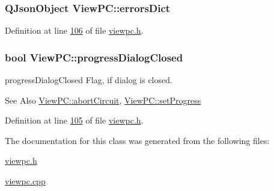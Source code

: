 \hypertarget{class_view_p_c_a26f90436aca32e5bad46f5e69a7e7e09}{
\subsubsection[{errors\-Dict}]{\setlength{\rightskip}{0pt plus 5cm}Q\-Json\-Object View\-P\-C\-::errors\-Dict}}\label{class_view_p_c_a26f90436aca32e5bad46f5e69a7e7e09}


Definition at line \hyperlink{viewpc_8h_source_l00106}{106} of file \hyperlink{viewpc_8h_source}{viewpc.\-h}.

\hypertarget{class_view_p_c_add8c82aa2b0b934212aa5bde9277ab36}{
\subsubsection[{progress\-Dialog\-Closed}]{\setlength{\rightskip}{0pt plus 5cm}bool View\-P\-C\-::progress\-Dialog\-Closed}}\label{class_view_p_c_add8c82aa2b0b934212aa5bde9277ab36}


progress\-Dialog\-Closed Flag, if dialog is closed. 

\begin{DoxySeeAlso}{See Also}
\hyperlink{class_view_p_c_ad7ba2fcf1d17862de15e32432823f7b0}{View\-P\-C\-::abort\-Circuit}, \hyperlink{class_view_p_c_a9c32a1fdb6ead84e5ada8fba8860c7ed}{View\-P\-C\-::set\-Progress} 
\end{DoxySeeAlso}


Definition at line \hyperlink{viewpc_8h_source_l00105}{105} of file \hyperlink{viewpc_8h_source}{viewpc.\-h}.



The documentation for this class was generated from the following files\-:\begin{DoxyCompactItemize}
\item 
\hyperlink{viewpc_8h}{viewpc.\-h}\item 
\hyperlink{viewpc_8cpp}{viewpc.\-cpp}\end{DoxyCompactItemize}
